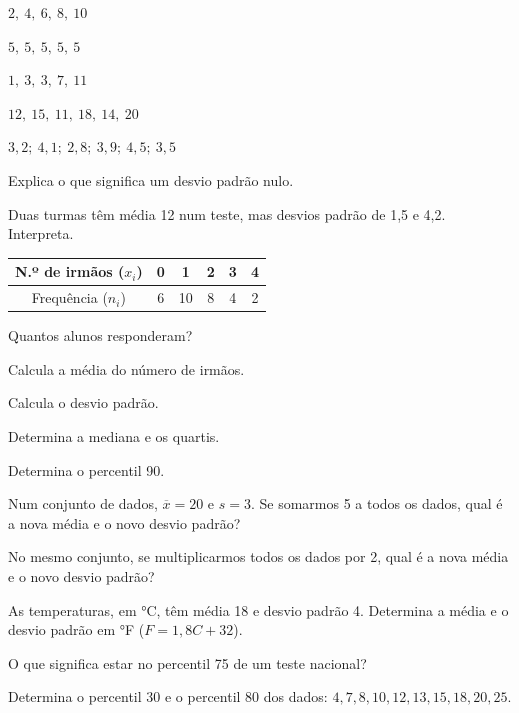 \documentclass[12pt]{article}
\begin{document}


\begin{exercicios}
  \item $2,\ 4,\ 6,\ 8,\ 10$
  \item $5,\ 5,\ 5,\ 5,\ 5$
  \item $1,\ 3,\ 3,\ 7,\ 11$
  \item $12,\ 15,\ 11,\ 18,\ 14,\ 20$
  \item $3{,}2;\ 4{,}1;\ 2{,}8;\ 3{,}9;\ 4{,}5;\ 3{,}5$
  \item Explica o que significa um desvio padrão nulo.
  \item Duas turmas têm média 12 num teste, mas desvios padrão de 1,5 e 4,2. Interpreta.
\end{exercicios}


\begin{center}
\begin{tabular}{|c|c|c|c|c|c|}\hline
  N.º de irmãos ($x_i$) & 0 & 1 & 2 & 3 & 4 \\\hline
  Frequência ($n_i$) & 6 & 10 & 8 & 4 & 2 \\\hline
\end{tabular}
\end{center}

\begin{exercicios}
  \item Quantos alunos responderam?
  \item Calcula a média do número de irmãos.
  \item Calcula o desvio padrão.
  \item Determina a mediana e os quartis.
  \item Determina o percentil 90.
\end{exercicios}

\begin{exercicios}
  \item Num conjunto de dados, $\overline{x} = 20$ e $s = 3$. Se somarmos 5 a todos os dados, qual é a nova média e o novo desvio padrão?
  \item No mesmo conjunto, se multiplicarmos todos os dados por 2, qual é a nova média e o novo desvio padrão?
  \item As temperaturas, em °C, têm média 18 e desvio padrão 4. Determina a média e o desvio padrão em °F ($F = 1{,}8C + 32$).
  \item O que significa estar no percentil 75 de um teste nacional?
  \item Determina o percentil 30 e o percentil 80 dos dados: $4, 7, 8, 10, 12, 13, 15, 18, 20, 25$.
\end{exercicios}
\end{document}
